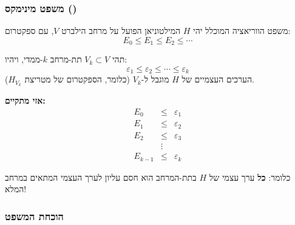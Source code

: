 \subsubsection*{משפט מינימקס ()}

\begin{theorembox}{משפט הווריאציה המוכלל}
יהי $H$ המילטוניאן הפועל על מרחב הילברט $V$, עם ספקטרום:
\[
E_0 \leq E_1 \leq E_2 \leq \cdots
\]

תהי $V_k \subset V$ תת-מרחב $k$-ממדי, ויהיו:
\[
\varepsilon_1 \leq \varepsilon_2 \leq \cdots \leq \varepsilon_k
\]
הערכים העצמיים של $H$ מוגבל ל-$V_k$ (כלומר, הספקטרום של מטריצת $H_{V_k}$).

\textbf{אזי מתקיים:}
\[
\boxed{
\begin{array}{rcl}
E_0 &\leq& \varepsilon_1 \\
E_1 &\leq& \varepsilon_2 \\
E_2 &\leq& \varepsilon_3 \\
&\vdots& \\
E_{k-1} &\leq& \varepsilon_k
\end{array}
}
\]

כלומר: \textbf{כל} ערך עצמי של $H$ בתת-המרחב הוא חסם עליון לערך העצמי המתאים במרחב המלא!
\end{theorembox}

\subsubsection*{הוכחת המשפט}

